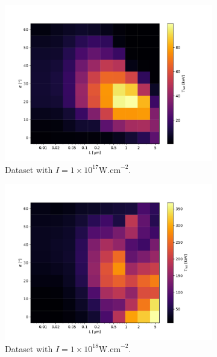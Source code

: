 \begin{figure}[ht]
	\centering
	\begin{subfigure}{0.49\textwidth}
		\centering
		\includegraphics[width=\textwidth]{figures/I_1e17t_hot}
		\caption{Dataset with $I = 1 \times 10^{17} \mathrm{W.cm}^{-2}$.}
		\label{fig:dataset1-a}
	\end{subfigure}
	\hfill
	\begin{subfigure}{0.49\textwidth}
		\centering
		\includegraphics[width=\textwidth]{figures/I_1e18t_hot}
		\caption{Dataset with $I = 1 \times 10^{18} \mathrm{W.cm}^{-2}$.}
		\label{fig:datset1-b}
	\end{subfigure}
	\begin{subfigure}{0.49\textwidth}

\end{subfigure}
\end{figure}

